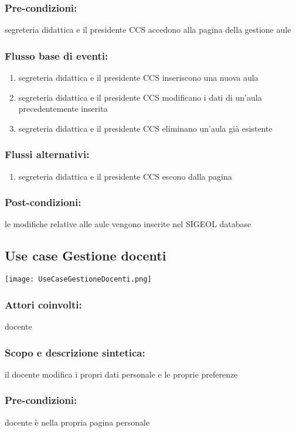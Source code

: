 \documentclass[11pt,a4paper]{article}
\begin{document}
\subsubsection*{Pre-condizioni:}
segreteria didattica e il presidente CCS accedono alla pagina della gestione aule
\subsubsection*{Flusso base di eventi:}
\begin{enumerate}
 \item segreteria didattica e il presidente CCS inseriscono una nuova aula
 \item segreteria didattica e il presidente CCS modificano i dati di un'aula precedentemente inserita
 \item segreteria didattica e il presidente CCS eliminano un'aula già esistente
\end{enumerate}
\subsubsection*{Flussi alternativi:}
\begin{enumerate} 
\item segreteria didattica e il presidente CCS escono dalla pagina
\end{enumerate}
\subsubsection*{Post-condizioni:}
le modifiche relative alle aule vengono inserite nel SIGEOL database
\subsection{Use case Gestione docenti}
\begin{center} 
 \texttt{[image: UseCaseGestioneDocenti.png]}
\end{center}
\subsubsection*{Attori coinvolti:}
docente
\subsubsection*{Scopo e descrizione sintetica:}
il docente modifica i propri dati personale e le proprie preferenze
\subsubsection*{Pre-condizioni:}
docente è nella propria pagina personale
\end{document}
